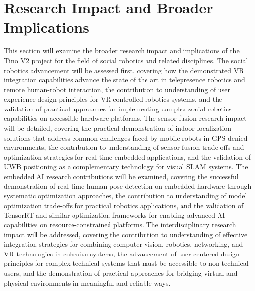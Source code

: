 \section{Research Impact and Broader Implications}
This section will examine the broader research impact and implications of the Tino V2 project for the field of social robotics and related disciplines. The social robotics advancement will be assessed first, covering how the demonstrated VR integration capabilities advance the state of the art in telepresence robotics and remote human-robot interaction, the contribution to understanding of user experience design principles for VR-controlled robotics systems, and the validation of practical approaches for implementing complex social robotics capabilities on accessible hardware platforms. The sensor fusion research impact will be detailed, covering the practical demonstration of indoor localization solutions that address common challenges faced by mobile robots in GPS-denied environments, the contribution to understanding of sensor fusion trade-offs and optimization strategies for real-time embedded applications, and the validation of UWB positioning as a complementary technology for visual SLAM systems. The embedded AI research contributions will be examined, covering the successful demonstration of real-time human pose detection on embedded hardware through systematic optimization approaches, the contribution to understanding of model optimization trade-offs for practical robotics applications, and the validation of TensorRT and similar optimization frameworks for enabling advanced AI capabilities on resource-constrained platforms. The interdisciplinary research impact will be addressed, covering the contribution to understanding of effective integration strategies for combining computer vision, robotics, networking, and VR technologies in cohesive systems, the advancement of user-centered design principles for complex technical systems that must be accessible to non-technical users, and the demonstration of practical approaches for bridging virtual and physical environments in meaningful and reliable ways.


